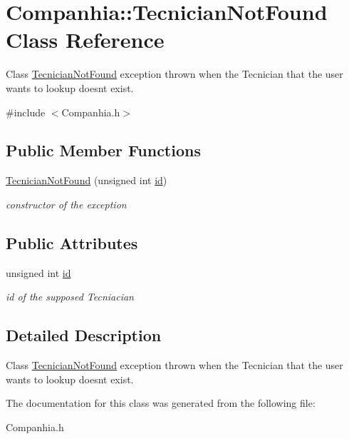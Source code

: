 \hypertarget{class_companhia_1_1_tecnician_not_found}{}\section{Companhia\+:\+:Tecnician\+Not\+Found Class Reference}
\label{class_companhia_1_1_tecnician_not_found}


Class \hyperlink{class_companhia_1_1_tecnician_not_found}{Tecnician\+Not\+Found} exception thrown when the Tecnician that the user wants to lookup doesn\textquotesingle{}t exist.  




{\ttfamily \#include $<$Companhia.\+h$>$}

\subsection*{Public Member Functions}
\begin{DoxyCompactItemize}
\item 
\mbox{\label{class_companhia_1_1_tecnician_not_found_adde59298e89206c68e5777305366af30}} 
\hyperlink{class_companhia_1_1_tecnician_not_found_adde59298e89206c68e5777305366af30}{Tecnician\+Not\+Found} (unsigned int \hyperlink{class_companhia_1_1_tecnician_not_found_ab3bfeffdac194d6007cc34eda4b825b7}{id})
\begin{DoxyCompactList}\small\item\em constructor of the exception \end{DoxyCompactList}\end{DoxyCompactItemize}
\subsection*{Public Attributes}
\begin{DoxyCompactItemize}
\item 
\mbox{\label{class_companhia_1_1_tecnician_not_found_ab3bfeffdac194d6007cc34eda4b825b7}} 
unsigned int \hyperlink{class_companhia_1_1_tecnician_not_found_ab3bfeffdac194d6007cc34eda4b825b7}{id}
\begin{DoxyCompactList}\small\item\em id of the supposed Tecniacian \end{DoxyCompactList}\end{DoxyCompactItemize}


\subsection{Detailed Description}
Class \hyperlink{class_companhia_1_1_tecnician_not_found}{Tecnician\+Not\+Found} exception thrown when the Tecnician that the user wants to lookup doesn\textquotesingle{}t exist. 

The documentation for this class was generated from the following file\+:\begin{DoxyCompactItemize}
\item 
Companhia.\+h\end{DoxyCompactItemize}
